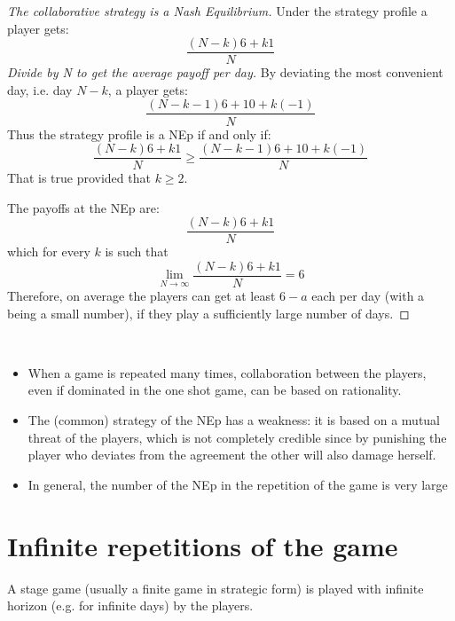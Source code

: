 \documentclass[../main.tex]{subfiles}
\begin{document}
\begin{proof}[The collaborative strategy is a Nash Equilibrium]
    Under the strategy profile a player gets:
    \[
        \frac{(N-k)6 +k1}{N}
    \]
    \textit{Divide by N to get the average payoff per day.}
    By deviating the most convenient day, i.e. day $N-k$, a player gets:
    \[
        \frac{(N-k-1)6 + 10 +k(-1)}{N}
    \]
    Thus the strategy profile is a \gls{NEp} if and only if:
    \[
        \frac{(N-k)6 +k1}{N} \geq \frac{(N-k-1)6 + 10 +k(-1)}{N}
    \]
    That is true provided that $k \geq 2$.

    The payoffs at the \gls{NEp} are:
    \[
        \frac{(N-k)6 +k1}{N}
    \]
    which for every $k$ is such that
    \[
        \lim_{N \to \infty} \frac{(N-k)6 +k1}{N} = 6
    \]
    Therefore, on average the players can get at least $6-a$ each per day (with a being a small number), if they play a sufficiently large number of days.
\end{proof}

\begin{remark}\
    \begin{itemize}
        \item When a game is repeated many times, collaboration between the players, even if dominated in the one shot game, can be based on rationality.
        \item The (common) strategy of the \gls{NEp} has a weakness: it is based on a mutual threat of the players, which is not completely credible since by punishing the player who deviates from the agreement the other will also damage herself.
        \item In general, the number of the \gls{NEp} in the repetition of the game is very large
    \end{itemize}
\end{remark}

\section{Infinite repetitions of the game}
A stage game (usually a finite game in strategic form) is played with infinite horizon (e.g. for infinite days) by the players.
\end{document}
